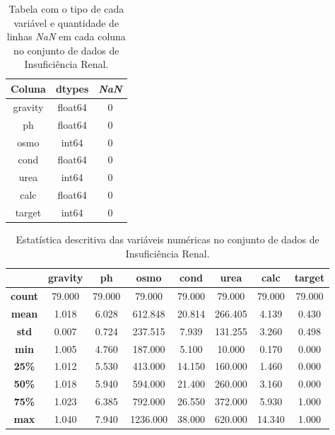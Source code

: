 \begin{table}[H]
\label{descritivo:kindey}
\centering
\begin{tabular}{|c|c|c|}
\hline
\textbf{Coluna} & \textbf{dtypes} & \textbf{\textit{NaN}}\\
\hline
gravity  &  float64 & 0 \\
\hline
ph       &  float64 & 0 \\
\hline
osmo     &    int64 & 0 \\
\hline
cond     &  float64 & 0 \\
\hline
urea     &    int64 & 0 \\
\hline
calc     &  float64 & 0 \\
\hline
target   &    int64 & 0 \\
\hline
\end{tabular}
\caption{Tabela com o tipo de cada variável e quantidade de linhas \textit{NaN} em cada coluna no conjunto de dados de Insuficiência Renal.}
\end{table}
\begin{table}[H]
\label{descritivo:kindey2}
\centering
\begin{tabular}{|c|c|c|c|c|c|c|c|}
\hline
& \textbf{gravity}	& \textbf{ph}	& \textbf{osmo}	& \textbf{cond} & \textbf{urea}	 & \textbf{calc}	 &\textbf{target} \\
\hline
\textbf{count}	& 79.000	& 79.000	& 79.000	& 79.000	& 79.000	& 79.000	& 79.000 \\
\hline
\textbf{mean}	& 1.018	& 6.028	& 612.848	&  20.814	& 266.405	& 4.139	& 0.430\\
\hline
\textbf{std}	    & 0.007	& 0.724	& 237.515	&  7.939	& 131.255	& 3.260	& 0.498\\
\hline
\textbf{min}	    & 1.005	& 4.760	& 187.000	&  5.100	& 10.000	& 0.170	& 0.000\\
\hline
\textbf{25\%}	& 1.012	& 5.530	& 413.000	&  14.150	& 160.000	& 1.460	& 0.000\\
\hline
\textbf{50\%}	& 1.018	& 5.940	& 594.000	&  21.400	& 260.000	& 3.160	& 0.000\\
\hline
\textbf{75\%}	& 1.023	& 6.385	& 792.000	&  26.550	& 372.000	& 5.930	& 1.000\\
\hline
\textbf{max}	    & 1.040	& 7.940	& 1236.000 &  38.000	& 620.000	& 14.340	& 1.000 \\
 \hline
\end{tabular}
\caption{Estatística descritiva das variáveis numéricas no conjunto de dados de Insuficiência Renal.}
\end{table}
